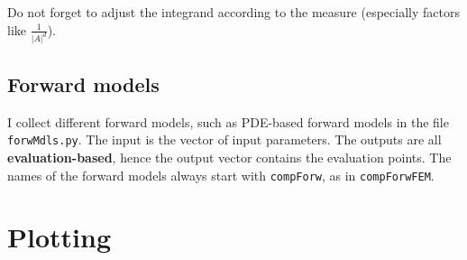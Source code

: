 \documentclass[11pt]{article}
\begin{document}
Do not forget to adjust the integrand according to the measure (especially factors like $\frac{1}{|A|^d}$). 


\subsection{Forward models}
I collect different forward models, such as PDE-based forward models in the file \texttt{forwMdls.py}.
The input is the vector of input parameters. The outputs are all \textbf{evaluation-based}, hence the output vector contains the evaluation points. The names of the forward models always start with \texttt{compForw}, as in \texttt{compForwFEM}.





\section{Plotting}
\end{document}
